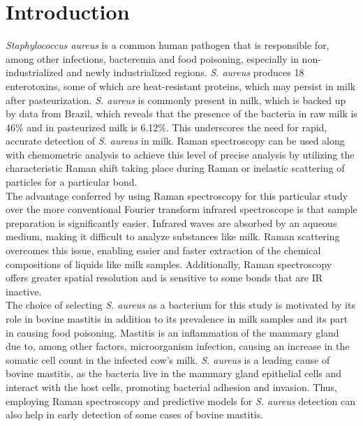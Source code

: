 
\section{Introduction}
\textit{Staphylococcus aureus} is a common human pathogen that is responsible for, among other infections, bacteremia and food poisoning, especially in non-industrialized and newly industrialized regions. \cite{Tong2015}  \textit{S. aureus} produces 18 enterotoxins, some of which are heat-resistant proteins, which may persist in milk after pasteurization. \cite{SciDir_SD_StaphEnterotoxin, Jin2016} \textit{S. aureus} is commonly present in milk, which is backed up by data from Brazil, which reveals that the presence of the bacteria in raw milk is 46\% and in pasteurized milk is 6.12\%. This underscores the need for rapid, accurate detection of \textit{S. aureus} in milk. \cite{Zhang2023}  Raman spectroscopy can be used along with chemometric analysis to achieve this level of precise analysis by utilizing the characteristic Raman shift taking place during Raman or inelastic scattering of particles for a particular bond.\\

\noindent The advantage conferred by using Raman spectroscopy for this particular study over the more conventional Fourier transform infrared spectroscope is that sample preparation is significantly easier. Infrared waves are absorbed by an aqueous medium, making it difficult to analyze substances like milk. Raman scattering overcomes this issue, enabling easier and faster extraction of the chemical compositions of liquids like milk samples. \cite{AzoOptics_1291}  Additionally, Raman spectroscopy offers greater spatial resolution and is sensitive to some bonds that are IR inactive. \cite{Walzak_FTIR_Raman} \\

\noindent The choice of selecting \textit{S. aureus} as a bacterium for this study is motivated by its role in bovine mastitis in addition to its prevalence in milk samples and its part in causing food poisoning. Mastitis is an inflammation of the mammary gland due to, among other factors, microorganism infection, causing an increase in the somatic cell count in the infected cow’s milk. \cite{Buczacki2020} \textit{S. aureus} is a leading cause of bovine mastitis, as the bacteria live in the mammary gland epithelial cells and interact with the host cells, promoting bacterial adhesion and invasion. \cite{Pavlova2022} Thus, employing Raman spectroscopy and predictive models for \textit{S. aureus} detection can also help in early detection of some cases of bovine mastitis. \\

